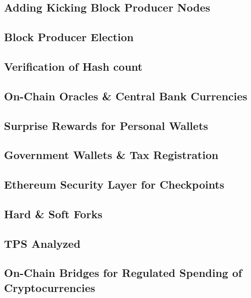 \documentclass[letterpaper,11pt]{article}
\begin{document}
\subsection{Adding Kicking Block Producer Nodes}
	
\subsection{Block Producer Election}
	
\subsection{Verification of Hash count}

\subsection{On-Chain Oracles \& Central Bank Currencies}
	
\subsection{Surprise Rewards for Personal Wallets}
	
\subsection{Government Wallets \& Tax Registration}

\subsection{Ethereum Security Layer for Checkpoints}

\subsection{Hard \& Soft Forks}
	
\subsection{TPS Analyzed}

\subsection{On-Chain Bridges for Regulated Spending of Cryptocurrencies}
\end{document}
